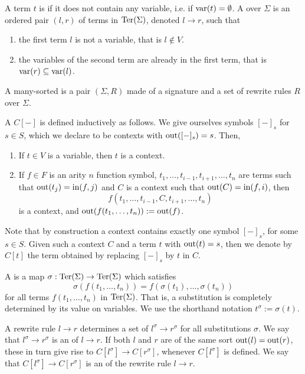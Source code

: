 A term $t$ is  if it does not contain any variable, i.e. if $\operatorname{var}(t)=\emptyset$.
A  over $\Sigma$ is an ordered pair $(l,r)$ of terms in $\operatorname{Ter}(\Sigma)$, denoted $l \to r$, such that
\begin{enumerate}
  \item the first term $l$ is not a variable, that is $l \notin V$.
  \item the variables of the second term are already in the first term, that is $\operatorname{var}(r) \subseteq \operatorname{var}(l)$.
\end{enumerate}

\begin{definition}
  A many-sorted  is a pair $(\Sigma,R)$ made of a signature and a set of rewrite rules $R$ over $\Sigma$.
\end{definition}

A  $C[-]$ is defined inductively as follows.
We give ourselves symbols $[-]_s$ for $s \in S$, which we declare to be contexts with $\operatorname{out}([-]_s)=s$. 
Then, 
\begin{enumerate}
  \item If $t \in V$ is a variable, then $t$ is a context.
  \item If $f \in F$ is an arity $n$ function symbol, $t_1,\ldots,t_{i-1},t_{i+1},\ldots,t_n$ are terms such that $\operatorname{out}(t_j)=\operatorname{in}(f,j)$ and $C$ is a context such that $\operatorname{out}(C)=\operatorname{in}(f,i)$, then 
  $$f(t_1,\ldots,t_{i-1},C,t_{i+1},\ldots,t_n)$$
   is a context, and $\operatorname{out}(f(t_1,\ldots,t_n)):=\operatorname{out}(f)$.
\end{enumerate}
Note that by construction a context contains exactly one symbol $[-]_s$, for some $s \in S$.
Given such a context $C$ and a term $t$ with $\operatorname{out}(t)=s$, then we denote by $C[t]$ the term obtained by replacing $[-]_s$ by $t$ in $C$.

A  is a map $\sigma : \operatorname{Ter}(\Sigma) \to \operatorname{Ter}(\Sigma)$ which satisfies $$\sigma(f(t_1,\ldots,t_n))=f(\sigma(t_1),\ldots,\sigma(t_n))$$ for all terms $f(t_1,\ldots,t_n)$ in $\operatorname{Ter}(\Sigma)$.
That is, a substitution is completely determined by its value on variables.
We use the shorthand notation $t^{\sigma}:=\sigma(t)$.

A rewrite rule $l \to r$ determines a set of  $l^\sigma \to r^\sigma$ for all substitutions $\sigma$. 
We say that $l^\sigma \to r^\sigma$ is an  of $l \to r$.
If both $l$ and $r$ are of the same sort $\operatorname{out}(l)=\operatorname{out}(r)$, these in turn give rise to  $C[l^\sigma] \to C[r^\sigma]$, whenever $C[l^\sigma]$ is defined. 
We say that $C[l^\sigma] \to C[r^\sigma]$ is an  of the rewrite rule $l \to r$.

